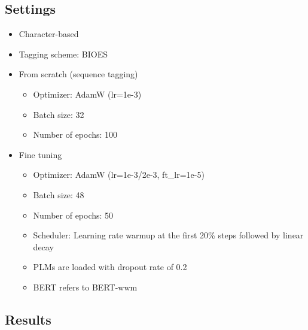 \documentclass{article}
\begin{document}
\subsection{Settings}
\begin{itemize}
    \item Character-based
    \item Tagging scheme: BIOES
    \item From scratch (sequence tagging)
    \begin{itemize}
        \item Optimizer: AdamW (lr=1e-3)
        \item Batch size: 32
        \item Number of epochs: 100
    \end{itemize}
    \item Fine tuning 
    \begin{itemize}
        \item Optimizer: AdamW (lr=1e-3/2e-3, ft\_lr=1e-5)
        \item Batch size: 48
        \item Number of epochs: 50
        \item Scheduler: Learning rate warmup at the first 20\% steps followed by linear decay
        \item PLMs are loaded with dropout rate of 0.2
        \item BERT refers to BERT-wwm \citep{cui2019pretraining}
    \end{itemize}
\end{itemize}


\subsection{Results}
\end{document}
